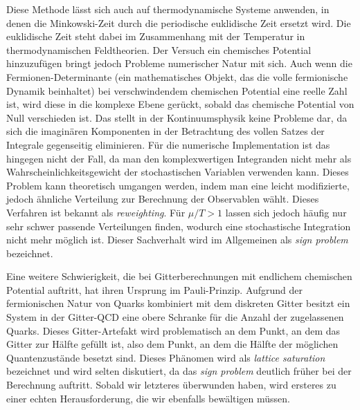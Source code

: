 Diese Methode lässt sich auch auf thermodynamische Systeme anwenden, in denen
die Minkowski-Zeit durch die periodische euklidische Zeit ersetzt wird. Die
euklidische Zeit steht dabei im Zusammenhang mit der Temperatur in
thermodynamischen Feldtheorien. Der Versuch ein chemisches Potential
hinzuzufügen bringt jedoch Probleme numerischer Natur mit sich. Auch wenn die
Fermionen-Determinante (ein mathematisches Objekt, das die volle fermionische
Dynamik beinhaltet) bei verschwindendem chemischen Potential eine reelle Zahl
ist, wird diese in die komplexe Ebene gerückt, sobald das chemische Potential
von Null verschieden ist. Das stellt in der Kontinuumsphysik keine Probleme dar,
da sich die imaginären Komponenten in der Betrachtung des vollen Satzes der
Integrale gegenseitig eliminieren. Für die numerische Implementation ist das
hingegen nicht der Fall, da man den komplexwertigen Integranden nicht mehr als
Wahrscheinlichkeitsgewicht der stochastischen Variablen verwenden kann. Dieses
Problem kann theoretisch umgangen werden, indem man eine leicht modifizierte,
jedoch ähnliche Verteilung zur Berechnung der Observablen wählt. Dieses
Verfahren ist bekannt als \emph{reweighting}. Für $\mu / T > 1$ lassen sich
jedoch häufig nur sehr schwer passende Verteilungen finden, wodurch eine
stochastische Integration nicht mehr möglich ist. Dieser Sachverhalt wird im
Allgemeinen als \emph{sign problem} bezeichnet.

Eine weitere Schwierigkeit, die bei Gitterberechnungen mit endlichem chemischen
Potential auftritt, hat ihren Ursprung im Pauli-Prinzip. Aufgrund der
fermionischen Natur von Quarks kombiniert mit dem diskreten Gitter besitzt ein
System in der Gitter-QCD eine obere Schranke für die Anzahl der zugelassenen
Quarks. Dieses Gitter-Artefakt wird problematisch an dem Punkt, an dem das
Gitter zur Hälfte gefüllt ist, also dem Punkt, an dem die Hälfte der möglichen
Quantenzustände besetzt sind. Dieses Phänomen wird als \emph{lattice saturation}
bezeichnet und wird selten diskutiert, da das \emph{sign problem} deutlich
früher bei der Berechnung auftritt. Sobald wir letzteres überwunden haben, wird
ersteres zu einer echten Herausforderung, die wir ebenfalls bewältigen müssen.

